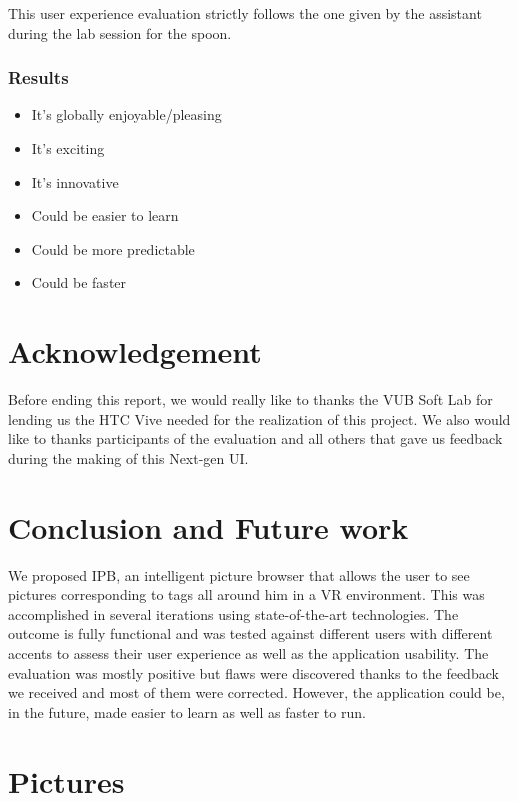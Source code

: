 \documentclass[11pt,a4paper]{article}
\begin{document}
This user experience evaluation strictly follows the one given by the assistant during the lab session for the spoon.

\subsubsection{Results}


\begin{itemize}
	\item It’s globally enjoyable/pleasing
	\item It’s exciting
	\item It’s innovative 
	\item Could be easier to learn 
	\item Could be more predictable
	\item Could be faster
\end{itemize}


\section{Acknowledgement}

Before ending this report, we would really like to thanks the VUB Soft Lab for lending us the HTC Vive needed for the realization of this project.
We also would like to thanks participants of the evaluation and all others that gave us feedback during the making of this Next-gen UI.

\section{Conclusion and Future work}
We proposed IPB, an intelligent picture browser that allows the user to see pictures corresponding to tags all around him in a VR environment. This was accomplished in several iterations using state-of-the-art technologies. The outcome is fully functional and was tested against different users with different accents to assess their user experience as well as the application usability. The evaluation was mostly positive but flaws were discovered thanks to the feedback we received and most of them were corrected. However, the application could be, in the future, made easier to learn as well as faster to run.
\pagebreak
\section{Pictures}
\end{document}
